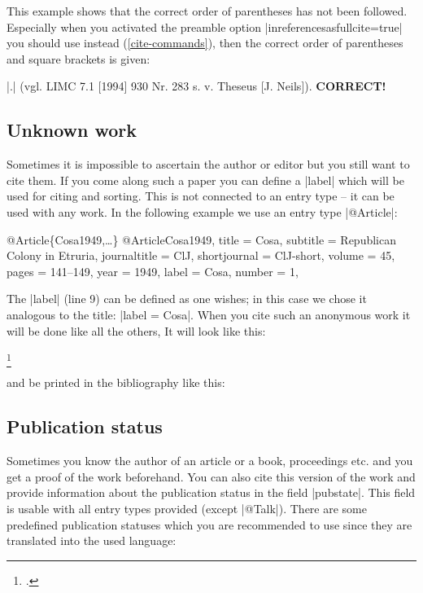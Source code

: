 \documentclass[a4paper,
10pt,
greek,
french,
spanish,
italian,
ngerman,
english,
]{ltxdoc}
\begin{document}
\DescribeMacro{\parencite} \DescribeMacro{\parencites}
This example shows that the correct order of parentheses has not been followed.
Especially when you activated the preamble option  |inreferencesasfullcite=true|  you should use  instead (\cref{cite-commands}), then the correct order of parentheses and square brackets is given:
\begin{tcolorbox}[examplebox]
|\parencite[vgl.][930 Nr. 283]{Neils1994}.| 
\tcblower
(vgl. LIMC 7.1 [1994] 930 Nr. 283 s. v. Theseus [J. Neils]). \textcolor{green!50!black}{\textbf{CORRECT!}}
\end{tcolorbox}

\subsection{Unknown work}\label{unknown}
Sometimes it is impossible to ascertain the author or editor but you still want to cite them.
If you come along such a paper you can define a |label| which will be used for citing and sorting.
This is not connected to an entry type -- it can be used with any work.
In the following example we use an entry type |@Article|:
\begin{bibexample}[label=Cosa1949]{{@}Article\{Cosa1949,…\}}
@Article{Cosa1949,
  title        = {Cosa},
  subtitle     = {Republican Colony in Etruria},
  journaltitle = ClJ,
  shortjournal = ClJ-short,
  volume       = {45},
  pages        = {141--149},
  year         = {1949},
  label        = {Cosa},
  number       = {1},
}
\end{bibexample}
 The |label| (line 9) can be defined as one wishes; in this case we chose it analogous to the title: |label = {Cosa}|.
When you cite such an anonymous work it will be done like all the others,
 It will look like this:
\begin{example}
\footnote{\cite[Vgl.][145--147]{Cosa1949}.}
\end{example}
and be printed in the bibliography like this:

\subsection{Publication status}
Sometimes you know the author of an article or a book, proceedings etc. and you get a proof of the work beforehand.
You can also cite this version of the work and provide information about the publication status in the field |pubstate|.
This field is usable with all entry types provided (except |@Talk|).
There are some predefined publication statuses which you are recommended to use since they are translated into the used language:
\end{document}
